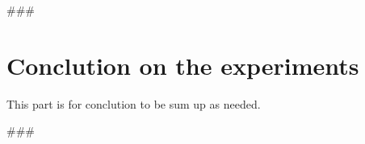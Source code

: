 
###

\section{Conclution on the experiments}\label{sec:conclution}
This part is for conclution to be sum up as needed.



###